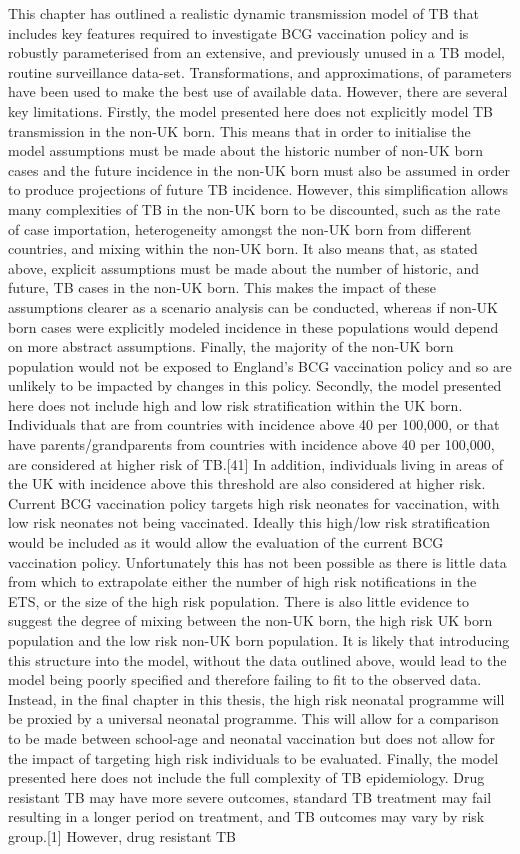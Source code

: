\documentclass[11pt,twoside]{bristolthesis}
\begin{document}
  This chapter has outlined a realistic dynamic transmission model of TB that includes key features required to investigate BCG vaccination policy and is robustly parameterised from an extensive, and previously unused in a TB model, routine surveillance data-set. Transformations, and approximations, of parameters have been used to make the best use of available data. However, there are several key limitations. Firstly, the model presented here does not explicitly model TB transmission in the non-UK born. This means that in order to initialise the model assumptions must be made about the historic number of non-UK born cases and the future incidence in the non-UK born must also be assumed in order to produce projections of future TB incidence. However, this simplification allows many complexities of TB in the non-UK born to be discounted, such as the rate of case importation, heterogeneity amongst the non-UK born from different countries, and mixing within the non-UK born. It also means that, as stated above, explicit assumptions must be made about the number of historic, and future, TB cases in the non-UK born. This makes the impact of these assumptions clearer as a scenario analysis can be conducted, whereas if non-UK born cases were explicitly modeled incidence in these populations would depend on more abstract assumptions. Finally, the majority of the non-UK born population would not be exposed to England's BCG vaccination policy and so are unlikely to be impacted by changes in this policy. Secondly, the model presented here does not include high and low risk stratification within the UK born. Individuals that are from countries with incidence above 40 per 100,000, or that have parents/grandparents from countries with incidence above 40 per 100,000, are considered at higher risk of TB.{[}41{]} In addition, individuals living in areas of the UK with incidence above this threshold are also considered at higher risk. Current BCG vaccination policy targets high risk neonates for vaccination, with low risk neonates not being vaccinated. Ideally this high/low risk stratification would be included as it would allow the evaluation of the current BCG vaccination policy. Unfortunately this has not been possible as there is little data from which to extrapolate either the number of high risk notifications in the ETS, or the size of the high risk population. There is also little evidence to suggest the degree of mixing between the non-UK born, the high risk UK born population and the low risk non-UK born population. It is likely that introducing this structure into the model, without the data outlined above, would lead to the model being poorly specified and therefore failing to fit to the observed data. Instead, in the final chapter in this thesis, the high risk neonatal programme will be proxied by a universal neonatal programme. This will allow for a comparison to be made between school-age and neonatal vaccination but does not allow for the impact of targeting high risk individuals to be evaluated. Finally, the model presented here does not include the full complexity of TB epidemiology. Drug resistant TB may have more severe outcomes, standard TB treatment may fail resulting in a longer period on treatment, and TB outcomes may vary by risk group.{[}1{]} However, drug resistant TB 
\end{document}
